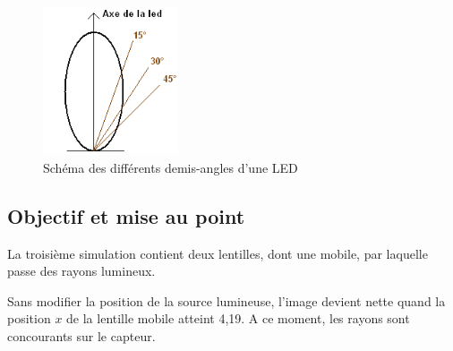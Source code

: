 






\begin{figure}[H]
      \center
      \includegraphics[width=4cm]{ressources/tp1/demi_angle.png}
      \caption{Schéma des différents demis-angles d'une LED}
\end{figure}

\subsection{Objectif et mise au point}

La troisième simulation contient deux lentilles, dont une mobile, par laquelle passe des rayons lumineux.\newline

Sans modifier la position de la source lumineuse, l'image devient nette quand la position $x$ de la lentille mobile 
atteint 4,19. A ce moment, les rayons sont concourants sur le capteur.\newline

